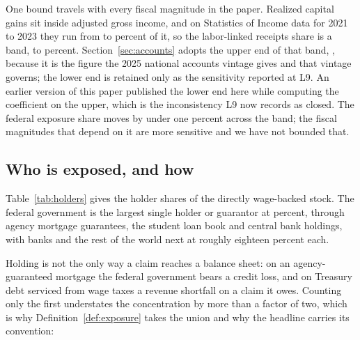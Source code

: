 One bound travels with every fiscal magnitude in the paper. Realized capital gains sit inside
adjusted gross income, and on Statistics of Income data for 2021 to 2023 they run from
 to  percent of it, so the labor-linked receipts share is
a band,  to  percent. Section~\ref{sec:accounts}
adopts the upper end of that band, , because it is the figure the 2025 national
accounts vintage gives and that vintage governs; the lower end is retained only as the
sensitivity reported at L9. An earlier version of this paper published the lower end here while
computing the coefficient on the upper, which is the inconsistency L9 now records as closed. The
federal exposure share moves by under one percent across the band; the fiscal magnitudes that depend on it are more sensitive and we have not bounded that.

\subsection{Who is exposed, and how}
\label{sec:holders}

Table~\ref{tab:holders} gives the holder shares of the directly wage-backed stock. The federal
government is the largest single holder or guarantor at  percent,
through agency mortgage guarantees, the student loan book and central bank holdings, with banks
and the rest of the world next at roughly eighteen percent each.

\begin{table}[htbp]
\centering
\caption{Holders of directly wage-backed claims, 2025, on the adopted wage basis. The column sums
to the wage-backed total of Table~\ref{tab:classes}, so holder amounts and the headline stock
combine directly. Holder shares are properties of the instrument and of the consolidation rule
and do not depend on the backing coefficient, so the map is the published shares applied to the
adopted coefficients; on the coverage coefficients the same calculation reproduces the
independently rebuilt map to within 0.05 billion dollars. Measured.}
\label{tab:holders}

\end{table}

Holding is not the only way a claim reaches a balance sheet: on an agency-guaranteed mortgage the
federal government bears a credit loss, and on Treasury debt serviced from wage taxes a revenue
shortfall on a claim it owes. Counting only the first understates the concentration by more than a
factor of two, which is why Definition~\ref{def:exposure} takes the union and why the headline
carries its convention:

